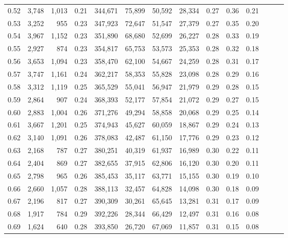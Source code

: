 \begin{tabular}{rrrrrrrrrrrrrr}
0.52 &   3,748 &  1,013 &  0.21 &  344,671 &   75,899 &  50,592 &  28,334 &  0.27 &  0.36 &      0.21 \\
0.53 &   3,252 &    955 &  0.23 &  347,923 &   72,647 &  51,547 &  27,379 &  0.27 &  0.35 &      0.20 \\
0.54 &   3,967 &  1,152 &  0.23 &  351,890 &   68,680 &  52,699 &  26,227 &  0.28 &  0.33 &      0.19 \\
0.55 &   2,927 &    874 &  0.23 &  354,817 &   65,753 &  53,573 &  25,353 &  0.28 &  0.32 &      0.18 \\
0.56 &   3,653 &  1,094 &  0.23 &  358,470 &   62,100 &  54,667 &  24,259 &  0.28 &  0.31 &      0.17 \\
0.57 &   3,747 &  1,161 &  0.24 &  362,217 &   58,353 &  55,828 &  23,098 &  0.28 &  0.29 &      0.16 \\
0.58 &   3,312 &  1,119 &  0.25 &  365,529 &   55,041 &  56,947 &  21,979 &  0.29 &  0.28 &      0.15 \\
0.59 &   2,864 &    907 &  0.24 &  368,393 &   52,177 &  57,854 &  21,072 &  0.29 &  0.27 &      0.15 \\
0.60 &   2,883 &  1,004 &  0.26 &  371,276 &   49,294 &  58,858 &  20,068 &  0.29 &  0.25 &      0.14 \\
0.61 &   3,667 &  1,201 &  0.25 &  374,943 &   45,627 &  60,059 &  18,867 &  0.29 &  0.24 &      0.13 \\
0.62 &   3,140 &  1,091 &  0.26 &  378,083 &   42,487 &  61,150 &  17,776 &  0.29 &  0.23 &      0.12 \\
0.63 &   2,168 &    787 &  0.27 &  380,251 &   40,319 &  61,937 &  16,989 &  0.30 &  0.22 &      0.11 \\
0.64 &   2,404 &    869 &  0.27 &  382,655 &   37,915 &  62,806 &  16,120 &  0.30 &  0.20 &      0.11 \\
0.65 &   2,798 &    965 &  0.26 &  385,453 &   35,117 &  63,771 &  15,155 &  0.30 &  0.19 &      0.10 \\
0.66 &   2,660 &  1,057 &  0.28 &  388,113 &   32,457 &  64,828 &  14,098 &  0.30 &  0.18 &      0.09 \\
0.67 &   2,196 &    817 &  0.27 &  390,309 &   30,261 &  65,645 &  13,281 &  0.31 &  0.17 &      0.09 \\
0.68 &   1,917 &    784 &  0.29 &  392,226 &   28,344 &  66,429 &  12,497 &  0.31 &  0.16 &      0.08 \\
0.69 &   1,624 &    640 &  0.28 &  393,850 &   26,720 &  67,069 &  11,857 &  0.31 &  0.15 &      0.08 \\

\end{tabular}
